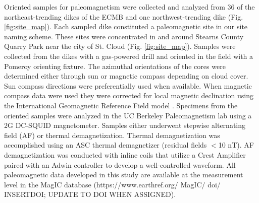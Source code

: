 \documentclass[draft]{agujournal2019}
\begin{document}
Oriented samples for paleomagnetism were collected and analyzed from 36 of the northeast-trending dikes of the ECMB and one northwest-trending dike (Fig. \ref{fig:site_map}). Each sampled dike constituted a paleomagnetic site in our site naming scheme. These sites were concentrated in and around Stearns County Quarry Park near the city of St. Cloud (Fig. \ref{fig:site_map}). Samples were collected from the dikes with a gas-powered drill and oriented in the field with a Pomeroy orienting fixture. The azimuthal orientations of the cores were determined either through sun or magnetic compass depending on cloud cover. Sun compass directions were preferentially used when available. When magnetic compass data were used they were corrected for local magnetic declination using the International Geomagnetic Reference Field model \cite{Thebault2015a}. Specimens from the oriented samples were analyzed in the UC Berkeley Paleomagnetism lab using a 2G DC-SQUID magnetometer. Samples either underwent stepwise alternating field (AF) or thermal demagnetization. Thermal demagnetization was accomplished using an ASC thermal demagnetizer (residual fields $<$10 nT). AF demagnetization was conducted with inline coils that utilize a Crest Amplifier paired with an Adwin controller to develop a well-controlled waveform. All paleomagnetic data developed in this study are available at the measurement level in the MagIC database (https://www.earthref.org/ MagIC/ doi/ INSERTDOI; UPDATE TO DOI WHEN ASSIGNED).
\end{document}
